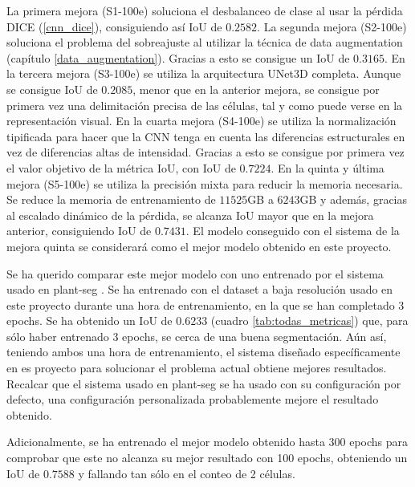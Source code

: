 La primera mejora (S1-100e) soluciona el desbalanceo de clase al usar la pérdida DICE (\ref{cnn_dice}), consiguiendo así IoU de $0.2582$. La segunda mejora (S2-100e) soluciona el problema del sobreajuste  al utilizar la técnica de data augmentation (capítulo \ref{data_augmentation}). Gracias a esto se consigue un IoU de $0.3165$. En la tercera mejora (S3-100e) se utiliza la arquitectura UNet3D completa. Aunque se consigue IoU de $0.2085$, menor que en la anterior mejora, se consigue por primera vez una delimitación precisa de las células, tal y como puede verse en la representación visual. En la cuarta mejora (S4-100e) se utiliza la normalización tipificada para hacer que la CNN tenga en cuenta las diferencias estructurales en vez de diferencias altas de intensidad. Gracias a esto se consigue por primera vez el valor objetivo de la métrica IoU, con IoU de $0.7224$. En la quinta y última mejora (S5-100e) se utiliza la precisión mixta para reducir la memoria necesaria. Se reduce la memoria de entrenamiento de $11525$GB a $6243$GB y además, gracias al escalado dinámico de la pérdida, se alcanza IoU mayor que en la mejora anterior, consiguiendo IoU de $0.7431$. El modelo conseguido con el sistema de la mejora quinta se considerará como el mejor modelo obtenido en este proyecto. 

Se ha querido comparar este mejor modelo con uno entrenado por el sistema usado en plant-seg \cite{Wolny2020}. Se ha entrenado con el dataset a baja resolución usado en este proyecto durante una hora de entrenamiento, en la que se han completado 3 epochs. Se ha obtenido un IoU de $0.6233$ (cuadro \ref{tab:todas_metricas}) que, para sólo haber entrenado 3 epochs, se cerca de una buena segmentación. Aún así, teniendo ambos una hora de entrenamiento, el sistema diseñado específicamente en es proyecto para solucionar el problema actual obtiene mejores resultados. Recalcar que el sistema usado en plant-seg se ha usado con su configuración por defecto, una configuración personalizada probablemente mejore el resultado obtenido.

Adicionalmente, se ha entrenado el mejor modelo obtenido hasta 300 epochs para comprobar que este no alcanza su mejor resultado con 100 epochs, obteniendo un IoU de $0.7588$ y fallando tan sólo en el conteo de 2 células.


